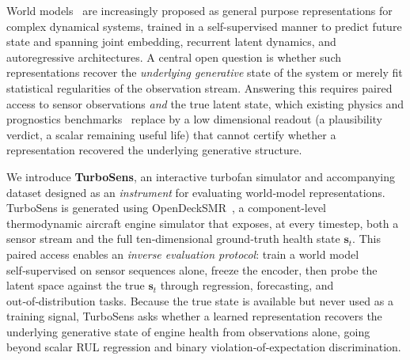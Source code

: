 \documentclass{article}
\begin{document}
World models~\cite{Balestriero_LeCun_2025, Assran_Bardes_Fan_Garrido_Howes_Mojtaba_Komeili_Muckley_Rizvi_Roberts_et_al_2025, okada2021dreaming, okada2022dreamingv2, Maes_Lidec_Scieur_LeCun_Balestriero_2026} are increasingly proposed as general purpose representations for complex dynamical systems, trained in a self-supervised manner to predict future state and spanning joint embedding, recurrent latent dynamics, and autoregressive architectures. A central open question is whether such representations recover the \emph{underlying generative} state of the system or merely fit statistical regularities of the observation stream. Answering this requires paired access to sensor observations \emph{and} the true latent state, which existing physics and prognostics benchmarks~\cite{bear1physion, riochet2018intphys, Bordes_Garrido_Kao_Williams_Rabbat_Dupoux_2025, Saxena_Goebel_Simon_Eklund_2008} replace by a low dimensional readout (a plausibility verdict, a scalar remaining useful life) that cannot certify whether a representation recovered the underlying generative structure.

We introduce \textbf{TurboSens}, an interactive turbofan simulator and accompanying dataset designed as an \emph{instrument} for evaluating world‑model representations. TurboSens is generated using OpenDeckSMR~\cite{psaropoulos_2025_17804895}, a component‑level thermodynamic aircraft engine simulator that exposes, at every timestep, both a sensor stream and the full ten‑dimensional ground‑truth health state $\mathbf{s}_t$. This paired access enables an \emph{inverse evaluation protocol}: train a world model self‑supervised on sensor sequences alone, freeze the encoder, then probe the latent space against the true $\mathbf{s}_t$ through regression, forecasting, and out‑of‑distribution tasks. Because the true state is available but never used as a training signal, TurboSens asks whether a learned representation recovers the underlying generative state of engine health from observations alone, going beyond scalar RUL regression and binary violation‑of‑expectation discrimination.
\end{document}
